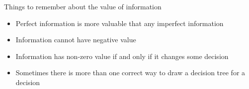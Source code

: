 \documentclass{beamer}\usepackage[]{graphicx}\usepackage[]{color}
\begin{document}
\begin{darkframes}
    \begin{frame}[fragile]{Things to remember about the value of information}
          \begin{itemize} [<+->]
            \item Perfect information is more valuable that any imperfect information
            \item Information cannot have negative value
            \item Information has non-zero value if and only if it changes some decision
            \item Sometimes there is more than one correct way to draw a decision tree for a decision
          \end{itemize}   
    \end{frame}

  \end{darkframes}
\end{document}
